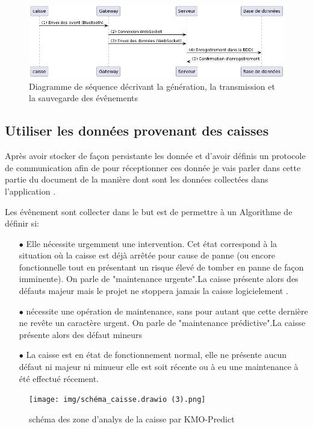 \documentclass[12pt]{article}
\begin{document}
\centering
\begin{figure}[h]
    \centering
     \includegraphics[width=\textwidth]{img/umlsequenceCheminEvent.png}
    \caption{Diagramme de séquence décrivant la génération, la transmission et la  sauvegarde des évênements}
    \label{fig:enter-label}
\end{figure}



\newpage
\justify
\subsection{Utiliser les données provenant des caisses }

\justify
\text Après avoir stocker de façon persistante les donnée et d'avoir définis un protocole de communication afin de pour réceptionner ces donnée je vais parler dans cette partie du document de la manière dont sont les données collectées dans l'application . 

\justify
\text Les évênement sont collecter dans le but est de permettre à un Algorithme de  définir si:
\begin{itemize}
    \item[$\bullet$] Elle nécessite urgemment une intervention. Cet état correspond à la situation où la caisse est déjà arrêtée pour cause de panne (ou encore fonctionnelle tout en présentant un risque élevé de tomber en panne de façon imminente). On parle de "maintenance urgente".La caisse présente alors des défauts majeur mais  le projet ne stoppera jamais la caisse logicielement .
    \item[$\bullet$]nécessite une opération de maintenance, sans pour autant que cette dernière ne revête un caractère urgent. On parle de "maintenance prédictive".La caisse présente alors des défaut mineurs
    \item[$\bullet$] La caisse est en état de fonctionnement normal, elle ne présente aucun défaut ni majeur ni minueur elle est soit récente  ou à eu une maintenance à été effectué récement.
\end{itemize}

\begin{figure}[H]
    \centering
    \texttt{[image: img/schéma\_caisse.drawio (3).png]}
    \caption{schéma des zone d'analys de la caisse par KMO-Predict}
    \label{fig:enter-label}
\end{figure}
\end{document}
